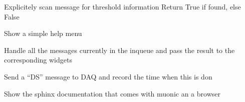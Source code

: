 \documentclass[letterpaper,10pt,english]{sphinxmanual}
\begin{document}
\begin{fulllineitems}
\begin{fulllineitems}
\end{fulllineitems}


\begin{fulllineitems}
\label{muonic:muonic.gui.MainWindow.MainWindow.get_thresholds_from_queue}
Explicitely scan message for threshold information
Return True if found, else False

\end{fulllineitems}


\begin{fulllineitems}
\label{muonic:muonic.gui.MainWindow.MainWindow.help_menu}
Show a simple help menu

\end{fulllineitems}


\begin{fulllineitems}
\label{muonic:muonic.gui.MainWindow.MainWindow.processIncoming}
Handle all the messages currently in the inqueue 
and pass the result to the corresponding widgets

\end{fulllineitems}


\begin{fulllineitems}
\label{muonic:muonic.gui.MainWindow.MainWindow.query_daq_for_scalars}
Send a ``DS'' message to DAQ and record the time when this is don

\end{fulllineitems}


\begin{fulllineitems}
\label{muonic:muonic.gui.MainWindow.MainWindow.sphinxdoc_menu}
Show the sphinx documentation that comes with muonic an a
browser


\end{fulllineitems}
\end{fulllineitems}
\end{document}
